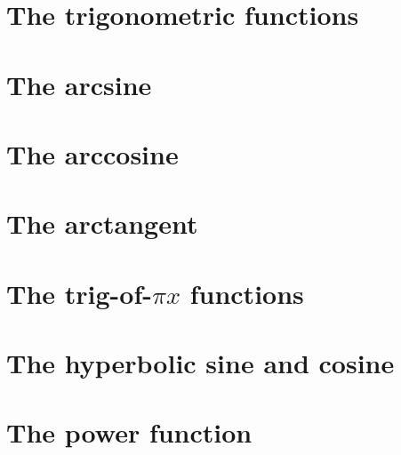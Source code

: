 \documentclass[a4paper]{book}
\begin{document}
\chapter{The trigonometric functions \label{chap:trigo}}


\chapter{The arcsine \label{chap:asin}}


\chapter{The arccosine \label{chap:acos}}


\chapter{The arctangent \label{chap:atan}}

\chapter{The trig-of-$\pi x$ functions  \label{chap:trigpi}}

\chapter{The hyperbolic sine and cosine \label{chap:csh}}

\chapter{The power function \label{chap:pow}}



\appendix


 

\end{document}
